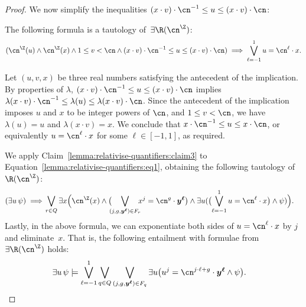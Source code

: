 \begin{proof}
    We now simplify the inequalities $(x \cdot v) \cdot \cn^{-1} \leq u \leq (x \cdot v) \cdot \cn$:
  
    \begin{claim}\label{lemma:relativise-quantifiers:claim3}
      The following formula is a tautology of~$\exists\R(\ipow{\cn})$:
      \[
        (\ipow{\cn}(u) \land \ipow{\cn}(x) \land 1 \leq v < \cn 
        \land (x \cdot v) \cdot \cn^{-1} \leq u \leq (x \cdot v) \cdot \cn) 
        \implies 
        \bigvee_{\ell = -1}^{1}
        u = \cn^{\ell} \cdot x.
      \]
    \end{claim}
    \begin{claimproof}
      Let $(u,v,x)$ be three real numbers satisfying the antecedent of the
      implication. By properties of $\lambda$, $(x \cdot v) \cdot \cn^{-1} \leq
      u \leq (x \cdot v) \cdot \cn$ implies $\lambda(x \cdot v) \cdot \cn^{-1}
      \leq \lambda(u) \leq \lambda(x \cdot v) \cdot \cn$. Since the antecedent
      of the implication imposes $u$ and $x$ to be integer powers of $\cn$, and
      $1 \leq v < \cn$, we have $\lambda(u) = u$ and $\lambda(x \cdot v) = x$.
      We conclude that $x \cdot \cn^{-1} \leq u \leq x \cdot \cn$, or
      equivalently $u = \cn^{\ell} \cdot x$ for some $\ell \in [-1,1]$, as
      required.
    \end{claimproof}
    We apply Claim~\ref{lemma:relativise-quantifiers:claim3} to
    Equation~\ref{lemma:relativise-quantifiers:eq1}, obtaining the following
    tautology of~$\R(\ipow{\cn})$:
    \begin{align*}
      (\exists u\, \psi)
      \implies\!
      \bigvee_{r \in Q}
      \exists x \Big(& \ipow{\cn}(x) \land 
      \big(\!\!\!\bigvee_{(j,g,\vec y^{\vec \ell}) \in F_r}\!\!\!
        x^{j} = \cn^{g} \cdot \vec y^{\vec \ell}      
      \big) \land \exists u ( \big(\!\bigvee_{\ell = -1}^{1}
      u = \cn^{\ell} \cdot x \big) \land \psi) \Big).
    \end{align*}
    Lastly, in the above formula, we can exponentiate both sides of $u =
    \cn^{\ell} \cdot x$ by $j$ and eliminate~$x$. That is, the following entailment 
    with formulae from~$\exists\R(\ipow{\cn})$ holds:
    \begin{align*}
      \exists u\, \psi
      \models 
      \bigvee_{\ell = -1}^{1} 
      \bigvee_{q \in Q}
      \bigvee_{(j,g,\vec y^{\vec \ell}) \in F_q}
      \exists u 
      \big(
        u^{j} = \cn^{j \cdot \ell + g} \cdot \vec y^{\vec \ell}      
        \land \psi
      \big).
      &\qedhere
    \end{align*}
  \end{proof}

